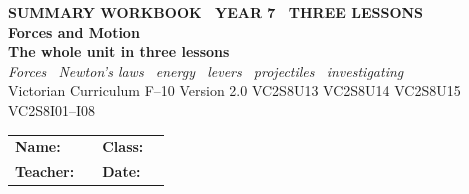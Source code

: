 \documentclass[11pt,a4paper]{article}
\begin{document}
\setlength{\parindent}{0pt}
\setlength{\parskip}{4pt}

\thispagestyle{plain}
\begin{tcolorbox}[enhanced, breakable=false, arc=4mm,
  colback=NavyBlue, colframe=NavyBlue, left=6mm, right=6mm, top=9mm, bottom=9mm, boxrule=0pt]
  \begin{center}
    {\headingfont\bfseries\color{Sky}\footnotesize\MakeUppercase{Summary workbook \textbullet\ Year 7 \textbullet\ three lessons}}\\[10pt]
    {\headingfont\bfseries\color{white}\fontsize{36}{42}\selectfont Forces and Motion}\\[6pt]
    {\headingfont\bfseries\color{white!85!NavyBlue}\Large The whole unit in three lessons}\\[10pt]
    {\large\color{white!85!NavyBlue}\itshape Forces \textbullet\ Newton's laws \textbullet\ energy \textbullet\ levers \textbullet\ projectiles \textbullet\ investigating}\\[14pt]
    {\headingfont\color{white!72!NavyBlue}\normalsize Victorian Curriculum F--10 Version 2.0 \textbar{}
     VC2S8U13 \textbar{} VC2S8U14 \textbar{} VC2S8U15 \textbar{} VC2S8I01--I08}
  \end{center}
\end{tcolorbox}

\vspace{10pt}
\begin{tabular}{@{}p{2.3cm} p{6.6cm} p{1.5cm} p{4.4cm}@{}}
  \textbf{Name:}    & \underline{\hspace{6.4cm}} & \textbf{Class:} & \underline{\hspace{4.2cm}} \\[10pt]
  \textbf{Teacher:} & \underline{\hspace{6.4cm}} & \textbf{Date:}  & \underline{\hspace{4.2cm}} \\
\end{tabular}
\end{document}
